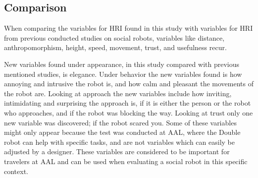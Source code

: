 \subsection{Comparison}
When comparing the variables for HRI found in this study with variables for HRI from previous conducted studies on social robots, variables like distance, anthropomorphism, height, speed, movement, trust, and usefulness recur. 

New variables found under appearance, in this study compared with previous mentioned studies, is elegance. Under behavior the new variables found is how annoying and intrusive the robot is, and how calm and pleasant the movements of the robot are. Looking at approach the new variables include how inviting, intimidating and surprising the approach is, if it is either the person or the robot who approaches, and if the robot was blocking the way. Looking at trust only one new variable was discovered; if the robot scared you. Some of these variables might only appear because the test was conducted at AAL, where the Double robot can help with specific tasks, and are not variables which can easily be adjusted by a designer. These variables are considered to be important for travelers at AAL and can be used when evaluating a social robot in this specific context. 